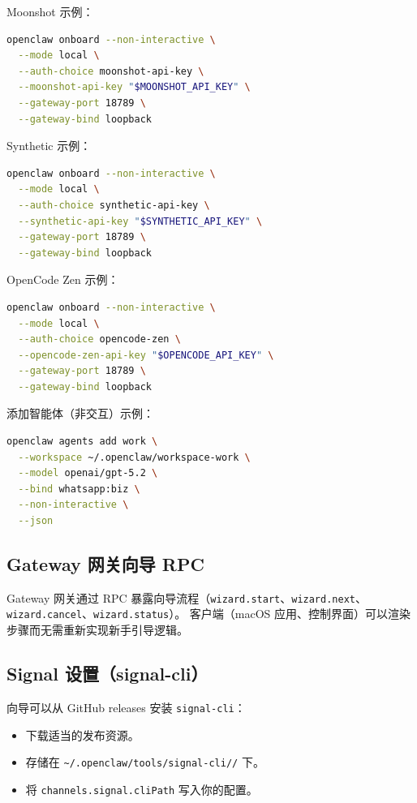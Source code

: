 Moonshot 示例：

\begin{lstlisting}[language=bash]
openclaw onboard --non-interactive \
  --mode local \
  --auth-choice moonshot-api-key \
  --moonshot-api-key "$MOONSHOT_API_KEY" \
  --gateway-port 18789 \
  --gateway-bind loopback
\end{lstlisting}


Synthetic 示例：

\begin{lstlisting}[language=bash]
openclaw onboard --non-interactive \
  --mode local \
  --auth-choice synthetic-api-key \
  --synthetic-api-key "$SYNTHETIC_API_KEY" \
  --gateway-port 18789 \
  --gateway-bind loopback
\end{lstlisting}


OpenCode Zen 示例：

\begin{lstlisting}[language=bash]
openclaw onboard --non-interactive \
  --mode local \
  --auth-choice opencode-zen \
  --opencode-zen-api-key "$OPENCODE_API_KEY" \
  --gateway-port 18789 \
  --gateway-bind loopback
\end{lstlisting}


添加智能体（非交互）示例：

\begin{lstlisting}[language=bash]
openclaw agents add work \
  --workspace ~/.openclaw/workspace-work \
  --model openai/gpt-5.2 \
  --bind whatsapp:biz \
  --non-interactive \
  --json
\end{lstlisting}


\subsection{Gateway 网关向导 RPC}


Gateway 网关通过 RPC 暴露向导流程（\texttt{wizard.start}、\texttt{wizard.next}、\texttt{wizard.cancel}、\texttt{wizard.status}）。
客户端（macOS 应用、控制界面）可以渲染步骤而无需重新实现新手引导逻辑。

\subsection{Signal 设置（signal-cli）}


向导可以从 GitHub releases 安装 \texttt{signal-cli}：

\begin{itemize}
  \item 下载适当的发布资源。
  \item 存储在 \texttt{\textasciitilde{}/.openclaw/tools/signal-cli//} 下。
  \item 将 \texttt{channels.signal.cliPath} 写入你的配置。
\end{itemize}


